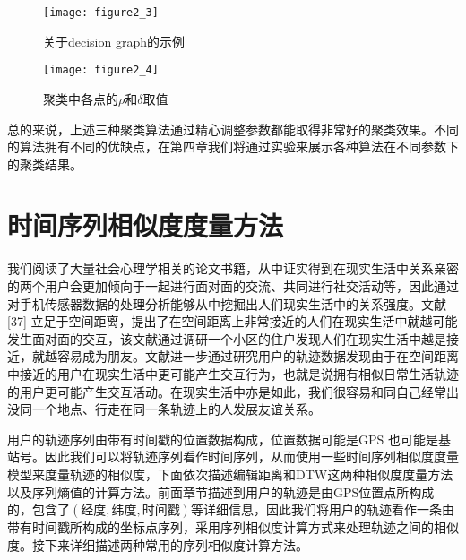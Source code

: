 \begin{figure}[htp]
\centering
\texttt{[image: figure2\_3]}
\caption{关于decision graph的示例}
\label{fig:2_3}
\end{figure}
\begin{figure}[htp]
\centering
\texttt{[image: figure2\_4]}
\caption{聚类中各点的$\rho$和$\delta$取值}
\label{fig:2_4}
\end{figure}
\par 总的来说，上述三种聚类算法通过精心调整参数都能取得非常好的聚类效果。不同的算法拥有不同的优缺点，在第四章我们将通过实验来展示各种算法在不同参数下的聚类结果。
\section{时间序列相似度度量方法}
\label{sec:section2-2}
我们阅读了大量社会心理学相关的论文书籍，从中证实得到在现实生活中关系亲密的两个用户会更加倾向于一起进行面对面的交流、共同进行社交活动等，因此通过对手机传感器数据的处理分析能够从中挖掘出人们现实生活中的关系强度。文献[37] 立足于空间距离，提出了在空间距离上非常接近的人们在现实生活中就越可能发生面对面的交互，该文献通过调研一个小区的住户发现人们在现实生活中越是接近，就越容易成为朋友。文献\cite{zajonc1968attitudinal}\cite{zillmann2000mood}进一步通过研究用户的轨迹数据发现由于在空间距离中接近的用户在现实生活中更可能产生交互行为，也就是说拥有相似日常生活轨迹的用户更可能产生交互活动。在现实生活中亦是如此，我们很容易和同自己经常出没同一个地点、行走在同一条轨迹上的人发展友谊关系。
\par 用户的轨迹序列由带有时间戳的位置数据构成，位置数据可能是GPS 也可能是基站号。因此我们可以将轨迹序列看作时间序列，从而使用一些时间序列相似度度量模型来度量轨迹的相似度，下面依次描述编辑距离和DTW这两种相似度度量方法以及序列熵值的计算方法。前面章节描述到用户的轨迹是由GPS位置点所构成的，包含了$(经度,纬度,时间戳)$等详细信息，因此我们将用户的轨迹看作一条由带有时间戳所构成的坐标点序列，采用序列相似度计算方式来处理轨迹之间的相似度。接下来详细描述两种常用的序列相似度计算方法。
